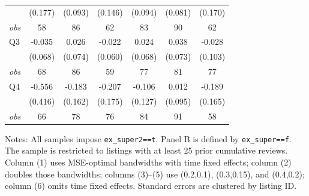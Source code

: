 \begin{table}[!htbp]
\begin{tabular}{lcccccc}
 & (0.177) & (0.093) & (0.146) & (0.094) & (0.081) & (0.170) \\
\textit{obs} & 58 & 86 & 62 & 83 & 90 & 62 \\
Q3 & -0.035 & 0.026 & -0.022 & 0.024 & 0.038 & -0.028 \\
 & (0.068) & (0.074) & (0.060) & (0.068) & (0.073) & (0.103) \\
\textit{obs} & 68 & 86 & 59 & 77 & 81 & 77 \\
Q4 & -0.556 & -0.183 & -0.207 & -0.106 & 0.012 & -0.189 \\
 & (0.416) & (0.162) & (0.175) & (0.127) & (0.095) & (0.165) \\
\textit{obs} & 66 & 78 & 76 & 84 & 91 & 58 \\
\bottomrule
\end{tabular}
\begin{minipage}{0.98\textwidth}\footnotesize
Notes: All samples impose \texttt{ex\_super2==t}. Panel B is defined by \texttt{ex\_super==f}. The sample is restricted to listings with at least 25 prior cumulative reviews. Column (1) uses MSE-optimal bandwidths with time fixed effects; column (2) doubles those bandwidths; columns (3)--(5) use (0.2,0.1), (0.3,0.15), and (0.4,0.2); column (6) omits time fixed effects. Standard errors are clustered by listing ID.
\end{minipage}
\end{table}


